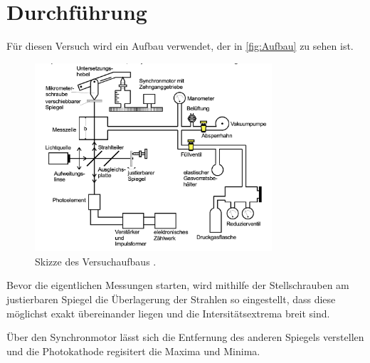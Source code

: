 \section{Durchführung}
\label{sec:Durchführung}
Für diesen Versuch wird ein Aufbau verwendet, der in \autoref{fig:Aufbau} zu sehen ist.
\begin{figure}[H]
    \centering
    \includegraphics[height=7cm]{content/pics/Aufbau.png}
    \caption{Skizze des Versuchaufbaus \cite{v401}.}
    \label{fig:Aufbau}
  \end{figure}
Bevor die eigentlichen Messungen starten, wird mithilfe der Stellschrauben am justierbaren Spiegel die Überlagerung
der Strahlen so eingestellt, dass diese möglichst exakt übereinander liegen und die Intersitätsextrema breit sind.

Über den Synchronmotor lässt sich die Entfernung des anderen Spiegels verstellen und die Photokathode regisitert die
Maxima und Minima.